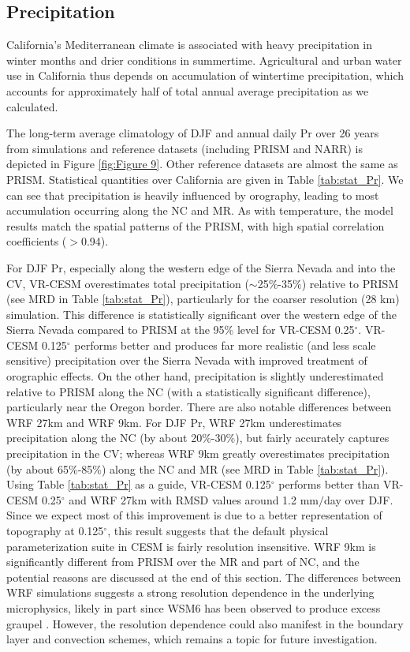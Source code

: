 \documentclass[ms]{agutex}   %
\begin{document}
\begin{article}
\subsection{Precipitation}

California's Mediterranean climate is associated with heavy precipitation in winter months and drier conditions in summertime.  Agricultural and urban water use in California thus depends on accumulation of wintertime precipitation, which accounts for approximately half of total annual average precipitation as we calculated.

The long-term average climatology of DJF and annual daily Pr over 26 years from simulations and reference datasets (including PRISM and NARR) is depicted in Figure \ref{fig:Figure 9}. Other reference datasets are almost the same as PRISM. Statistical quantities over California are given in Table \ref{tab:stat_Pr}. We can see that precipitation is heavily influenced by orography, leading to most accumulation occurring along the NC and MR. As with temperature, the model results match the spatial patterns of the PRISM, with high spatial correlation coefficients ($>$0.94).

For DJF Pr, especially along the western edge of the Sierra Nevada and into the CV, VR-CESM overestimates total precipitation ($\sim$25$\%$-35$\%$) relative to PRISM (see MRD in Table \ref{tab:stat_Pr}), particularly for the coarser resolution (28 km) simulation. This difference is statistically significant over the western edge of the Sierra Nevada compared to PRISM at the 95\% level for VR-CESM 0.25$^\circ$. VR-CESM 0.125$^\circ$ performs better and produces far more realistic (and less scale sensitive) precipitation over the Sierra Nevada with improved treatment of orographic effects. On the other hand, precipitation is slightly underestimated relative to PRISM along the NC (with a statistically significant difference), particularly near the Oregon border. There are also notable differences between WRF 27km and WRF 9km. For DJF Pr, WRF 27km underestimates precipitation along the NC (by about 20$\%$-30$\%$), but fairly accurately captures precipitation in the CV; whereas WRF 9km greatly overestimates precipitation (by about 65$\%$-85$\%$) along the NC and MR (see MRD in Table \ref{tab:stat_Pr}). Using Table \ref{tab:stat_Pr} as a guide, VR-CESM 0.125$^\circ$ performs  better than VR-CESM 0.25$^\circ$ and WRF 27km with RMSD values around 1.2 mm$/$day over DJF. Since we expect most of this improvement is due to a better representation of topography at 0.125$^\circ$, this result suggests that the default physical parameterization suite in CESM is fairly resolution insensitive. WRF 9km is significantly different from PRISM over the MR and part of NC, and the potential reasons are discussed at the end of this section. The differences between WRF simulations suggests a strong resolution dependence in the underlying microphysics, likely in part since WSM6 has been observed to produce excess graupel \citep{jankov2009evaluation}. However, the resolution dependence could also manifest in the boundary layer and convection schemes, which remains a topic for future investigation.


\end{article}
\end{document}
